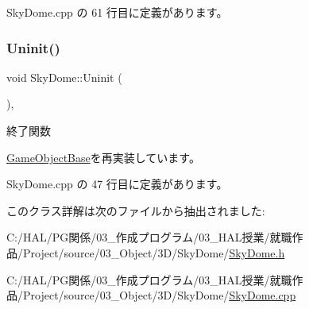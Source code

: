  Sky\+Dome.\+cpp の 61 行目に定義があります。

\mbox{\label{class_sky_dome_a7fc71bfa671cf6e7ab26a194459b0753}} 
\subsubsection{\texorpdfstring{Uninit()}{Uninit()}}
{\footnotesize\ttfamily void Sky\+Dome\+::\+Uninit (\begin{DoxyParamCaption}{ }\end{DoxyParamCaption})\hspace{0.3cm}{\ttfamily [override]}, {\ttfamily [virtual]}}



終了関数 



\mbox{\hyperlink{class_game_object_base_a97e1bc277d7b1c0156d4735de29a022c}{Game\+Object\+Base}}を再実装しています。



 Sky\+Dome.\+cpp の 47 行目に定義があります。



このクラス詳解は次のファイルから抽出されました\+:\begin{DoxyCompactItemize}
\item 
C\+:/\+H\+A\+L/\+P\+G関係/03\+\_\+作成プログラム/03\+\_\+\+H\+A\+L授業/就職作品/\+Project/source/03\+\_\+\+Object/3\+D/\+Sky\+Dome/\mbox{\hyperlink{_sky_dome_8h}{Sky\+Dome.\+h}}\item 
C\+:/\+H\+A\+L/\+P\+G関係/03\+\_\+作成プログラム/03\+\_\+\+H\+A\+L授業/就職作品/\+Project/source/03\+\_\+\+Object/3\+D/\+Sky\+Dome/\mbox{\hyperlink{_sky_dome_8cpp}{Sky\+Dome.\+cpp}}\end{DoxyCompactItemize}

